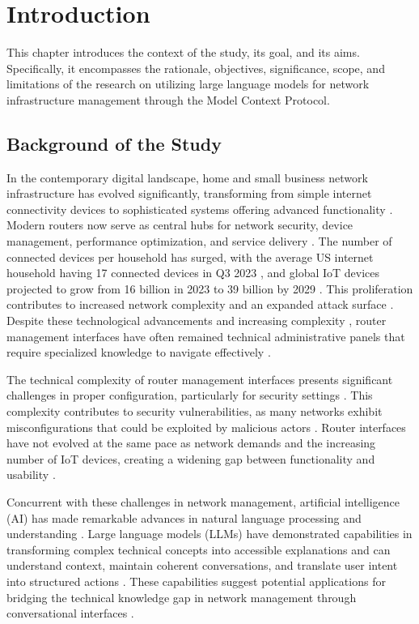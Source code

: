 \chapter{Introduction}
\label{chap:typing}
This chapter introduces the context of the study, its goal, and its aims. Specifically, it encompasses the rationale, objectives, significance, scope, and limitations of the research on utilizing large language models for network infrastructure management through the Model Context Protocol.

\section{Background of the Study}
In the contemporary digital landscape, home and small business network infrastructure has evolved significantly, transforming from simple internet connectivity devices to sophisticated systems offering advanced functionality \cite{smarthome_evolution}. Modern routers now serve as central hubs for network security, device management, performance optimization, and service delivery \cite{router_security_vulnerabilities}. The number of connected devices per household has surged, with the average US internet household having 17 connected devices in Q3 2023 \cite{parks_associates}, and global IoT devices projected to grow from 16 billion in 2023 to 39 billion by 2029 \cite{statista_devices}. This proliferation contributes to increased network complexity and an expanded attack surface \cite{iot_device_management}. Despite these technological advancements and increasing complexity \cite{network_complexity_survey}, router management interfaces have often remained technical administrative panels that require specialized knowledge to navigate effectively \cite{home_network_challenges}.

The technical complexity of router management interfaces presents significant challenges in proper configuration, particularly for security settings \cite{wifi_security_settings}. This complexity contributes to security vulnerabilities, as many networks exhibit misconfigurations that could be exploited by malicious actors \cite{consumer_cybersecurity}. Router interfaces have not evolved at the same pace as network demands and the increasing number of IoT devices, creating a widening gap between functionality and usability \cite{iot_device_management}.

Concurrent with these challenges in network management, artificial intelligence (AI) has made remarkable advances in natural language processing and understanding \cite{llm_explainability}. Large language models (LLMs) have demonstrated capabilities in transforming complex technical concepts into accessible explanations and can understand context, maintain coherent conversations, and translate user intent into structured actions \cite{llm_reasoning}. These capabilities suggest potential applications for bridging the technical knowledge gap in network management through conversational interfaces \cite{ai_networking}.

